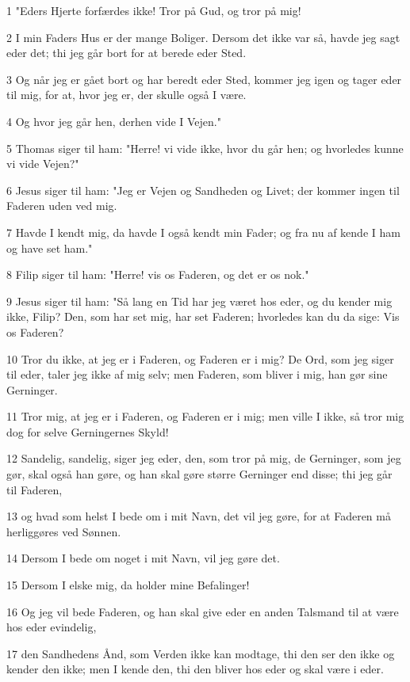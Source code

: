 \par 1 "Eders Hjerte forfærdes ikke! Tror på Gud, og tror på mig!
\par 2 I min Faders Hus er der mange Boliger. Dersom det ikke var så, havde jeg sagt eder det; thi jeg går bort for at berede eder Sted.
\par 3 Og når jeg er gået bort og har beredt eder Sted, kommer jeg igen og tager eder til mig, for at, hvor jeg er, der skulle også I være.
\par 4 Og hvor jeg går hen, derhen vide I Vejen."
\par 5 Thomas siger til ham: "Herre! vi vide ikke, hvor du går hen; og hvorledes kunne vi vide Vejen?"
\par 6 Jesus siger til ham: "Jeg er Vejen og Sandheden og Livet; der kommer ingen til Faderen uden ved mig.
\par 7 Havde I kendt mig, da havde I også kendt min Fader; og fra nu af kende I ham og have set ham."
\par 8 Filip siger til ham: "Herre! vis os Faderen, og det er os nok."
\par 9 Jesus siger til ham: "Så lang en Tid har jeg været hos eder, og du kender mig ikke, Filip? Den, som har set mig, har set Faderen; hvorledes kan du da sige: Vis os Faderen?
\par 10 Tror du ikke, at jeg er i Faderen, og Faderen er i mig? De Ord, som jeg siger til eder, taler jeg ikke af mig selv; men Faderen, som bliver i mig, han gør sine Gerninger.
\par 11 Tror mig, at jeg er i Faderen, og Faderen er i mig; men ville I ikke, så tror mig dog for selve Gerningernes Skyld!
\par 12 Sandelig, sandelig, siger jeg eder, den, som tror på mig, de Gerninger, som jeg gør, skal også han gøre, og han skal gøre større Gerninger end disse; thi jeg går til Faderen,
\par 13 og hvad som helst I bede om i mit Navn, det vil jeg gøre, for at Faderen må herliggøres ved Sønnen.
\par 14 Dersom I bede om noget i mit Navn, vil jeg gøre det.
\par 15 Dersom I elske mig, da holder mine Befalinger!
\par 16 Og jeg vil bede Faderen, og han skal give eder en anden Talsmand til at være hos eder evindelig,
\par 17 den Sandhedens Ånd, som Verden ikke kan modtage, thi den ser den ikke og kender den ikke; men I kende den, thi den bliver hos eder og skal være i eder.
